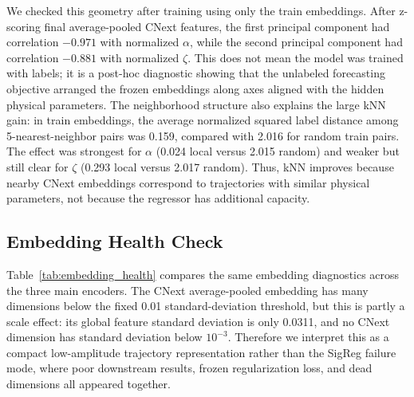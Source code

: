 \documentclass{article}
\begin{document}
We checked this geometry after training using only the train embeddings. After z-scoring final average-pooled CNext features, the first principal component had correlation $-0.971$ with normalized $\alpha$, while the second principal component had correlation $-0.881$ with normalized $\zeta$. This does not mean the model was trained with labels; it is a post-hoc diagnostic showing that the unlabeled forecasting objective arranged the frozen embeddings along axes aligned with the hidden physical parameters. The neighborhood structure also explains the large kNN gain: in train embeddings, the average normalized squared label distance among 5-nearest-neighbor pairs was 0.159, compared with 2.016 for random train pairs. The effect was strongest for $\alpha$ (0.024 local versus 2.015 random) and weaker but still clear for $\zeta$ (0.293 local versus 2.017 random). Thus, kNN improves because nearby CNext embeddings correspond to trajectories with similar physical parameters, not because the regressor has additional capacity.

\subsection{Embedding Health Check}

Table~\ref{tab:embedding_health} compares the same embedding diagnostics across the three main encoders. The CNext average-pooled embedding has many dimensions below the fixed 0.01 standard-deviation threshold, but this is partly a scale effect: its global feature standard deviation is only 0.0311, and no CNext dimension has standard deviation below $10^{-3}$. Therefore we interpret this as a compact low-amplitude trajectory representation rather than the SigReg failure mode, where poor downstream results, frozen regularization loss, and dead dimensions all appeared together.

\begin{center}
\captionsetup{hypcap=false}
\label{tab:embedding_health}
\end{center} 
\end{document}
